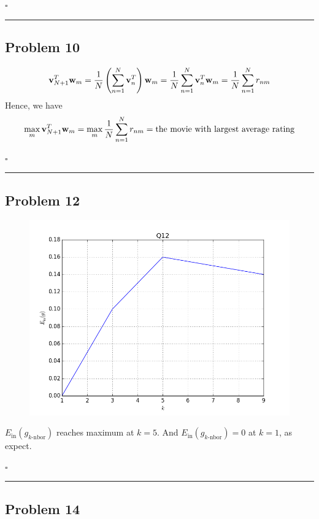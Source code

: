 \documentclass[12pt]{article}
\newcommand*{\QEDB}{\hfill\ensuremath{\square}}
\newcommand{\ParTh}[1]{\left(#1\right)}
\newcommand{\BF}[1]{{\bf#1}}
\newcommand{\horrule}[1]{\rule{\linewidth}{#1}}
\begin{document}
\QEDB

\horrule{0.5pt}

\subsection*{Problem 10}

\begin{align}
\BF{v}^T_{N+1}\BF{w}_m=\dfrac{1}{N}\ParTh{\sum_{n=1}^{N}\BF{v}^T_n}\BF{w}_m=\dfrac{1}{N}\sum_{n=1}^{N}\BF{v}^T_n\BF{w}_m=\dfrac{1}{N}\sum_{n=1}^{N}r_{nm}
\end{align}
Hence, we have
\begin{align}
\max_{m}\BF{v}^T_{N+1}\BF{w}_m=\max_{m}\dfrac{1}{N}\sum_{n=1}^{N}r_{nm}=\text{the movie with largest average rating}
\end{align}

\QEDB

\horrule{0.5pt}

\subsection*{Problem 12}

\begin{figure}[H]
	\centering
	\includegraphics[scale=0.5]{Q12.png}
\end{figure}
$E_{\text{in}}\ParTh{g_{k\text{-nbor}}}$ reaches maximum at $k=5$. And $E_{\text{in}}\ParTh{g_{k\text{-nbor}}}=0$ at $k=1$, as expect.

\QEDB

\horrule{0.5pt}

\subsection*{Problem 14}
\end{document}
